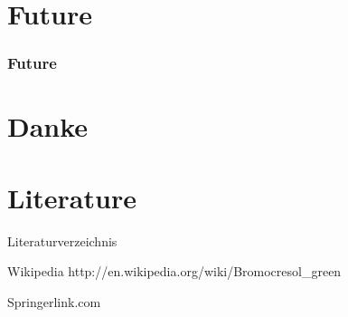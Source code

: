 \section{Future}
\begin{frame}
	\frametitle{Future}
	\vspace{1cm} %
	\begin{figure}
	  \centering
	\end{figure}

\end{frame}

\section{Danke}



\section{Literature}
\begin{frame}{Literaturverzeichnis}
	\begin{thebibliography}{10}
    
	\beamertemplateonlinebibitems
	Wikipedia
	\newblock {}
	\newblock http://en.wikipedia.org/wiki/Bromocresol\_green

	\beamertemplatearticlebibitems
	Springerlink.com
	\newblock {}
  \end{thebibliography}
\end{frame}

